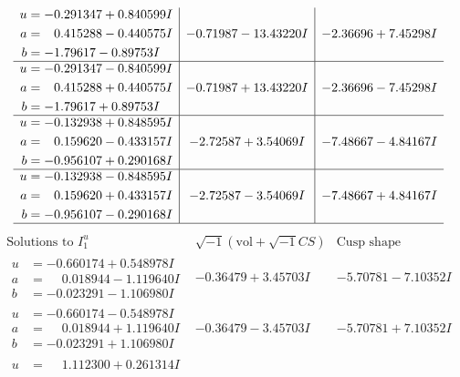 \documentclass[1p]{elsarticle_modified}
\theoremstyle{definition}
\newcommand{\I}{\sqrt{-1}}
\begin{document}
$$\begin{array}{c|c|c}
\begin{aligned}
u &= -0.291347 + 0.840599 I \\
a &= \phantom{-}0.415288 - 0.440575 I \\
b &= -1.79617 - 0.89753 I\end{aligned}
 & -0.71987 - 13.43220 I & -2.36696 + 7.45298 I \\ \hline\begin{aligned}
u &= -0.291347 - 0.840599 I \\
a &= \phantom{-}0.415288 + 0.440575 I \\
b &= -1.79617 + 0.89753 I\end{aligned}
 & -0.71987 + 13.43220 I & -2.36696 - 7.45298 I \\ \hline\begin{aligned}
u &= -0.132938 + 0.848595 I \\
a &= \phantom{-}0.159620 - 0.433157 I \\
b &= -0.956107 + 0.290168 I\end{aligned}
 & -2.72587 + 3.54069 I & -7.48667 - 4.84167 I \\ \hline\begin{aligned}
u &= -0.132938 - 0.848595 I \\
a &= \phantom{-}0.159620 + 0.433157 I \\
b &= -0.956107 - 0.290168 I\end{aligned}
 & -2.72587 - 3.54069 I & -7.48667 + 4.84167 I\\
 \hline 
 \end{array}$$\newpage$$\begin{array}{c|c|c}  
\text{Solutions to }I^u_{1}& \I (\text{vol} + \sqrt{-1}CS) & \text{Cusp shape}\\
 \hline 
\begin{aligned}
u &= -0.660174 + 0.548978 I \\
a &= \phantom{-}0.018944 - 1.119640 I \\
b &= -0.023291 - 1.106980 I\end{aligned}
 & -0.36479 + 3.45703 I & -5.70781 - 7.10352 I \\ \hline\begin{aligned}
u &= -0.660174 - 0.548978 I \\
a &= \phantom{-}0.018944 + 1.119640 I \\
b &= -0.023291 + 1.106980 I\end{aligned}
 & -0.36479 - 3.45703 I & -5.70781 + 7.10352 I \\ \hline\begin{aligned}
u &= \phantom{-}1.112300 + 0.261314 I \\

\end{aligned}
\end{array}$$
\end{document}
